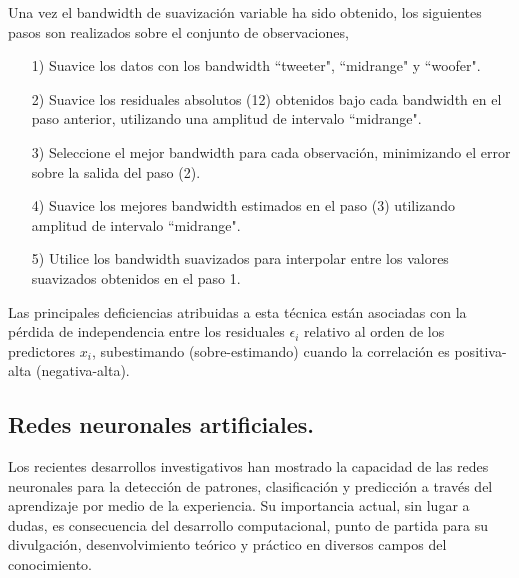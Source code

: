 \hspace*{0.4 cm} Una vez el bandwidth de suavizaci\'on variable ha sido obtenido, los siguientes pasos son realizados sobre el conjunto de observaciones,

\begin{itemize}
  \item[1)] Suavice los datos con los bandwidth ``tweeter"\hspace*{0.01 cm}, ``midrange"\hspace*{0.01 cm} y ``woofer"\hspace*{0.01 cm}.
  \item[2)] Suavice los residuales absolutos (12) obtenidos bajo cada bandwidth en el paso anterior, utilizando una amplitud de intervalo ``midrange"\hspace*{0.01 cm}.
  \item[3)] Seleccione el mejor bandwidth para cada observaci\'on, minimizando el error sobre la salida del paso (2).
  \item[4)] Suavice los mejores bandwidth estimados en el paso (3) utilizando amplitud de intervalo ``midrange"\hspace*{0.01 cm}.
  \item[5)] Utilice los bandwidth suavizados para interpolar entre los valores suavizados obtenidos en el paso 1.
\end{itemize}


\hspace*{0.4 cm} Las principales deficiencias atribuidas a esta t\'ecnica est\'an asociadas con la p\'erdida de independencia entre los residuales $\epsilon_{i}$ relativo al orden de los predictores $x_{i}$, subestimando (sobre-estimando) cuando la correlaci\'on es positiva-alta (negativa-alta).

\subsection{Redes neuronales artificiales.\\}


\hspace*{0.4 cm} Los recientes desarrollos investigativos han mostrado la capacidad de las redes neuronales para la detecci\'on de patrones, clasificaci\'on y predicci\'on a trav\'es del aprendizaje por medio de la experiencia. Su importancia actual, sin lugar a dudas, es consecuencia del desarrollo computacional, punto de partida para su divulgaci\'on, desenvolvimiento te\'orico y pr\'actico en diversos campos del conocimiento.

